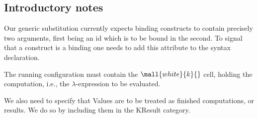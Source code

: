 \begin{latexComment}
\section{Introductory notes}

Our generic substitution currently expects binding constructs to contain
precisely two arguments, first being an id which is to be bound in the second.
To signal that a construct is a binding one needs to add this attribute  
to the syntax declaration.

The running configuration must contain the $\mall{white}{k}{}$ cell, 
holding the computation, i.e., the $\lambda$-expression to be evaluated.  

We also need to specify that Values are to be treated as finished computations,
or results.  
We do so by including them in the KResult category.
\end{latexComment}
